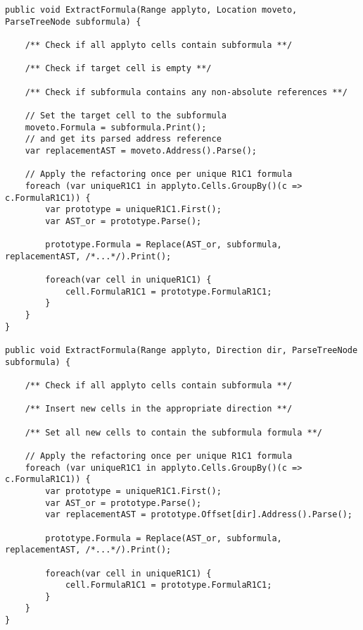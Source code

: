 \lstset{style=sharpc}
\begin{lstlisting}[float,caption={Extract formula refactoring (simplified)}, label={lst:extractformula}]
public void ExtractFormula(Range applyto, Location moveto, ParseTreeNode subformula) {
	
	/** Check if all applyto cells contain subformula **/
	
	/** Check if target cell is empty **/
	
	/** Check if subformula contains any non-absolute references **/
	
	// Set the target cell to the subformula
	moveto.Formula = subformula.Print();
	// and get its parsed address reference
	var replacementAST = moveto.Address().Parse();
	
	// Apply the refactoring once per unique R1C1 formula
	foreach (var uniqueR1C1 in applyto.Cells.GroupBy()(c => c.FormulaR1C1)) {
		var prototype = uniqueR1C1.First();
		var AST_or = prototype.Parse();
		
		prototype.Formula = Replace(AST_or, subformula, replacementAST, /*...*/).Print();
		
		foreach(var cell in uniqueR1C1) {
			cell.FormulaR1C1 = prototype.FormulaR1C1;
		}
	}
}

public void ExtractFormula(Range applyto, Direction dir, ParseTreeNode subformula) {
	
	/** Check if all applyto cells contain subformula **/
	
	/** Insert new cells in the appropriate direction **/
	
	/** Set all new cells to contain the subformula formula **/
	
	// Apply the refactoring once per unique R1C1 formula
	foreach (var uniqueR1C1 in applyto.Cells.GroupBy()(c => c.FormulaR1C1)) {
		var prototype = uniqueR1C1.First();
		var AST_or = prototype.Parse();
		var replacementAST = prototype.Offset[dir].Address().Parse();
		
		prototype.Formula = Replace(AST_or, subformula, replacementAST, /*...*/).Print();

		foreach(var cell in uniqueR1C1) {
			cell.FormulaR1C1 = prototype.FormulaR1C1;
		}
	}
}
\end{lstlisting}

